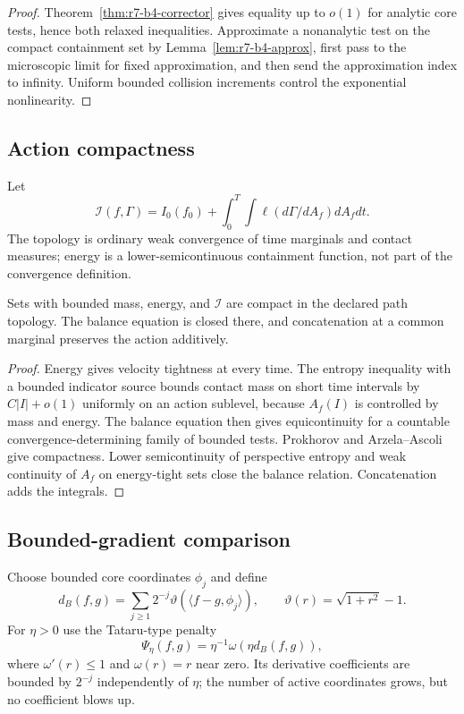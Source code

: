 \begin{proof}
Theorem~\ref{thm:r7-b4-corrector} gives equality up to $o(1)$ for analytic
core tests, hence both relaxed inequalities.  Approximate a nonanalytic test on
the compact containment set by Lemma~\ref{lem:r7-b4-approx}, first pass to the
microscopic limit for fixed approximation, and then send the approximation
index to infinity.  Uniform bounded collision increments control the
exponential nonlinearity.
\end{proof}

\subsection{Action compactness}

Let
\[
 \mathcal I(f,\Gamma)=I_0(f_0)+
 \int_0^T\int\ell(d\Gamma/dA_f)dA_fdt.
\]
The topology is ordinary weak convergence of time marginals and contact
measures; energy is a lower-semicontinuous containment function, not part of
the convergence definition.

\begin{lemma}
\label{lem:r7-b4-compact}
Sets with bounded mass, energy, and $\mathcal I$ are compact in the declared
path topology.  The balance equation is closed there, and concatenation at a
common marginal preserves the action additively.
\end{lemma}

\begin{proof}
Energy gives velocity tightness at every time.  The entropy inequality with a
bounded indicator source bounds contact mass on short time intervals by
$C|I|+o(1)$ uniformly on an action sublevel, because $A_f(I)$ is controlled by
mass and energy.  The balance equation then gives equicontinuity for a
countable convergence-determining family of bounded tests.  Prokhorov and
Arzela--Ascoli give compactness.  Lower semicontinuity of perspective entropy
and weak continuity of $A_f$ on energy-tight sets close the balance relation.
Concatenation adds the integrals.
\end{proof}

\subsection{Bounded-gradient comparison}

Choose bounded core coordinates $\phi_j$ and define
\[
 d_B(f,g)=\sum_{j\ge1}2^{-j}
 \vartheta(\langle f-g,\phi_j\rangle),
 \qquad
 \vartheta(r)=\sqrt{1+r^2}-1.
\]
For $\eta>0$ use the Tataru-type penalty
\[
 \Psi_\eta(f,g)=\eta^{-1}\omega(\eta d_B(f,g)),
\]
where $\omega'(r)\le1$ and $\omega(r)=r$ near zero.  Its derivative
coefficients are bounded by $2^{-j}$ independently of $\eta$; the number of
active coordinates grows, but no coefficient blows up.

